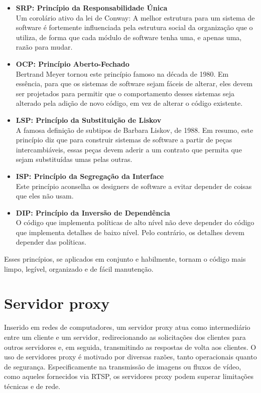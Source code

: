 \documentclass[12pt, %
openright, 
oneside, %
a4paper,    %
brazil]{facom-ufu-abntex2}
\begin{document}
\begin{itemize}
	\item \textbf{SRP: Princípio da Responsabilidade Única}\\
	      Um corolário ativo da lei de Conway: A melhor estrutura para um
	      sistema de software é fortemente influenciada pela estrutura social da
	      organização que o utiliza, de forma que cada módulo de software tenha uma, e
	      apenas uma, razão para mudar.

	\item \textbf{OCP: Princípio Aberto-Fechado}\\
	      Bertrand Meyer tornou este princípio famoso na década de 1980. Em
	      essência, para que os sistemas de software sejam fáceis de alterar, eles devem
	      ser projetados para permitir que o comportamento desses sistemas seja alterado
	      pela adição de novo código, em vez de alterar o código existente.

	\item \textbf{LSP: Princípio da Substituição de Liskov}\\
	      A famosa definição de subtipos de Barbara Liskov, de 1988. Em
	      resumo, este princípio diz que para construir sistemas de software a partir de
	      peças intercambiáveis, essas peças devem aderir a um contrato que permita que
	      sejam substituídas umas pelas outras.

	\item \textbf{ISP: Princípio da Segregação da Interface}\\
	      Este princípio aconselha os designers de software a evitar
	      depender de coisas que eles não usam.

	\item \textbf{DIP: Princípio da Inversão de Dependência}\\
	      O código que implementa políticas de alto nível não deve depender
	      do código que implementa detalhes de baixo nível. Pelo contrário, os detalhes
	      devem depender das políticas.
\end{itemize}

Esses princípios, se aplicados em conjunto e habilmente, tornam o código mais
limpo, legível, organizado e de fácil manutenção.

\section{Servidor proxy}

Inserido em redes de computadores, um servidor proxy atua como intermediário
entre um cliente e um servidor, redirecionando as solicitações dos clientes
para outros servidores e, em seguida, transmitindo as respostas de volta aos
clientes. O uso de servidores proxy é motivado por diversas razões, tanto
operacionais quanto de segurança. Especificamente na transmissão de imagens ou
fluxos de vídeo, como aqueles fornecidos via RTSP, os servidores proxy podem
superar limitações técnicas e de rede.
\end{document}
